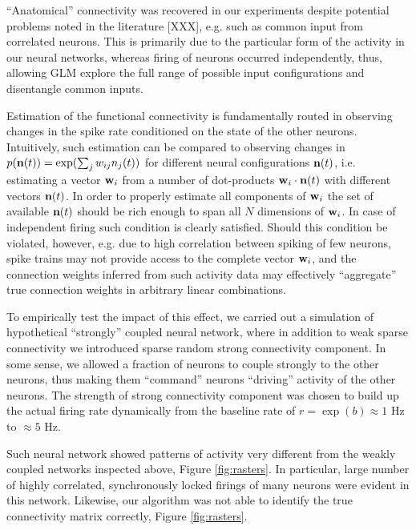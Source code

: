 ``Anatomical'' connectivity was recovered in our experiments despite potential problems noted in the literature [XXX], e.g. such as common input from correlated neurons. This is primarily due to the particular form of the activity in our neural networks, whereas firing of neurons occurred independently, thus, allowing GLM explore the full range of possible input configurations and disentangle common inputs.

Estimation of the functional connectivity is fundamentally routed in observing changes in the spike rate conditioned on the state of the other neurons. Intuitively, such estimation can be compared to observing changes in $p({\bf n}(t))=\exp(\sum_j w_{ij}n_j(t))$ for different neural configurations ${\bf n}(t)$, i.e. estimating a vector ${\bf w}_i$ from a number of dot-products ${\bf w}_i\cdot {\bf n}(t)$ with different vectors ${\bf n}(t)$. In order to properly estimate all components of ${\bf w}_i$ the set of available ${\bf n}(t)$ should be rich enough to span all $N$ dimensions of ${\bf w}_i$. In case of independent firing such condition is clearly satisfied.  Should this condition be violated, however, e.g. due to high correlation between spiking of few neurons, spike trains may not provide access to the complete vector ${\bf w}_i$, and the connection weights inferred from such activity data may effectively ``aggregate'' true connection weights in arbitrary linear combinations.

To empirically test the impact of this effect, we carried out a simulation of hypothetical ``strongly'' coupled  neural network, where in addition to weak sparse connectivity we introduced sparse random strong connectivity component. In some sense, we allowed a fraction of neurons to couple strongly to the other neurons, thus making them ``command'' neurons ``driving'' activity of the other neurons. The strength of strong connectivity component was chosen to build up the actual firing rate dynamically from the baseline rate of $r=\exp(b)\approx 1$ Hz to $\approx 5$  Hz.

Such neural network showed patterns of activity very different from the weakly coupled networks inspected above, Figure \ref{fig:rasters}.  In particular, large number of highly correlated, synchronously locked firings of many neurons were evident in this network.  Likewise, our algorithm was not able to identify the true connectivity matrix correctly, Figure \ref{fig:rasters}.

